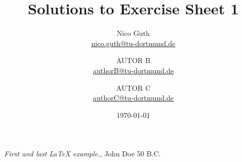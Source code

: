 \documentclass{scrartcl}
\title{Solutions to Exercise Sheet 1}
\author{
    Nico Guth  \\
    \href{mailto:nico.guth@tu-dortmund.de}{nico.guth@tu-dortmund.de}
	\and
	AUTOR B\\
    \href{mailto:authorB@tu-dortmund.de}{authorB@tu-dortmund.de}
	\and
	AUTOR C\\
    \href{mailto:authorC@tu-dortmund.de}{authorC@tu-dortmund.de}
	}
\date{\today}
\begin{document}
\maketitle




\begin{thebibliography}{9}
 \emph{First and last \LaTeX{} example.},
John Doe 50 B.C. 
\end{thebibliography}
\end{document}
